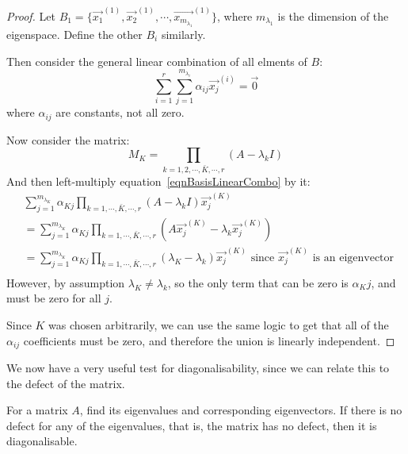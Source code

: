 \documentclass[../Main.tex]{subfiles}
\begin{document}
\begin{proof}
    Let $B_1 = \{\vec{x_1}^{(1)}, \vec{x_2}^{(1)}, \cdots, \vec{x_{m_{\lambda_1}}}^{(1)}\}$, where $m_{\lambda_1}$ is the dimension of the eigenspace. Define the other $B_i$ similarly.\par
    Then consider the general linear combination of all elments of $B$:
    \begin{equation}
        \sum_{i=1}^{r} \sum_{j=1}^{m_{\lambda_i}} \alpha_{ij} \vec{x_j}^{(i)} = \vec{0}
        \label{eqnBasisLinearCombo}
    \end{equation}
    where $\alpha_{ij}$ are constants, not all zero.\par
    Now consider the matrix:
    \begin{equation*}
        M_K = \prod_{k = 1, 2, \cdots, \bar{K}, \cdots, r} (A - \lambda_k I)
    \end{equation*}
    And then left-multiply equation~\ref{eqnBasisLinearCombo} by it:
    \begin{align*}
        &\sum_{j=1}^{m_{\lambda_K}} \alpha_{Kj} \prod_{k = 1, \cdots, \bar{K}, \cdots, r} (A - \lambda_k I) \vec{x_j}^{(K)} \\
        &= \sum_{j=1}^{m_{\lambda_K}} \alpha_{Kj} \prod_{k = 1, \cdots, \bar{K}, \cdots, r} (A\vec{x_j}^{(K)} - \lambda_k \vec{x_j}^{(K)}) \\
        &= \sum_{j=1}^{m_{\lambda_K}} \alpha_{Kj} \prod_{k = 1, \cdots, \bar{K}, \cdots, r} (\lambda_K - \lambda_k) \vec{x_j}^{(K)} \text{ since } \vec{x_j}^{(K)} \text{ is an eigenvector } \\
    \end{align*}
    However, by assumption $\lambda_K \neq \lambda_k$, so the only term that can be zero is $\alpha_Kj$, and must be zero for all $j$.\par
    Since $K$ was chosen arbitrarily, we can use the same logic to get that all of the $\alpha_{ij}$ coefficients must be zero, and therefore the union is linearly independent.
\end{proof}
\begin{remark}
    We now have a very useful test for diagonalisability, since we can relate this to the defect of the matrix.\par
    For a matrix $A$, find its eigenvalues and corresponding eigenvectors. If there is no defect for any of the eigenvalues, that is, the matrix has no defect, then it is diagonalisable.
\end{remark}
\end{document}
